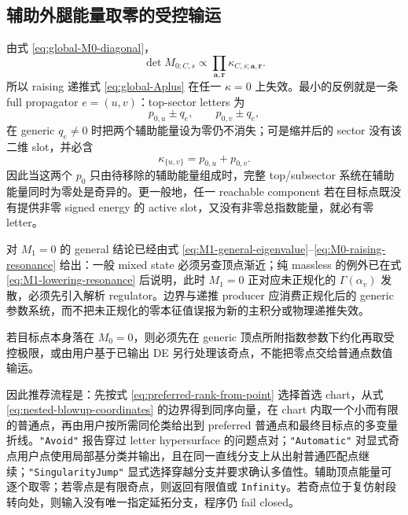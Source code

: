 \documentclass[11pt,a4paper]{ctexart}
\begin{document}
\subsection{辅助外腿能量取零的受控输运}

由式 \eqref{eq:global-M0-diagonal}，
\begin{equation}
 \det M_{0;C,s}\propto
 \prod_{\bm a,\bm r}\kappa_{C,s;\bm a,\bm r}.
 \label{eq:M0-determinant-letters}
\end{equation}
所以 raising 递推式 \eqref{eq:global-Aplus} 在任一 $\kappa=0$ 上失效。最小的反例就是一条 full propagator $e=(u,v)$：top-sector letters 为
\begin{equation}
 p_{0,u}\pm q_e,
 \qquad
 p_{0,v}\pm q_e,
 \end{equation}
在 generic $q_e\neq0$ 时把两个辅助能量设为零仍不消失；可是缩并后的 sector 没有该二维 slot，并必含
\begin{equation}
 \kappa_{\{u,v\}}=p_{0,u}+p_{0,v}.
 \label{eq:contracted-zero-letter}
\end{equation}
因此当这两个 $p_0$ 只由待移除的辅助能量组成时，完整 top/subsector 系统在辅助能量同时为零处是奇异的。更一般地，任一 reachable component 若在目标点既没有提供非零 signed energy 的 active slot，又没有非零总指数能量，就必有零 letter。

对 $M_1=0$ 的 general 结论已经由式 \eqref{eq:M1-general-eigenvalue}--\eqref{eq:M0-raising-resonance} 给出：一般 mixed state 必须另查顶点渐近；纯 massless 的例外已在式 \eqref{eq:M1-lowering-resonance} 后说明，此时 $M_1=0$ 正对应未正规化的 $\Gamma(\alpha_v)$ 发散，必须先引入解析 regulator。边界与递推 producer 应消费正规化后的 generic 参数系统，而不把未正规化的零本征值误报为新的主积分或物理递推失效。

若目标点本身落在 $M_0=0$，则必须先在 generic 顶点所附指数参数下约化再取受控极限，或由用户基于已输出 DE 另行处理该奇点，不能把零点交给普通点数值输运。

因此推荐流程是：先按式 \eqref{eq:preferred-rank-from-point} 选择首选 chart，从式 \eqref{eq:nested-blowup-coordinates} 的边界得到同序向量，在 chart 内取一个小而有限的普通点，再由用户按所需同伦类给出到 preferred 普通点和最终目标点的多变量折线。\texttt{"Avoid"} 报告穿过 letter hypersurface 的问题点对；\texttt{"Automatic"} 对显式奇点用户点使用局部基分类并输出，且在同一直线分支上从出射普通匹配点继续；\texttt{"SingularityJump"} 显式选择穿越分支并要求确认多值性。辅助顶点能量可逐个取零；若零点是有限奇点，则返回有限值或 \texttt{Infinity}。若奇点位于复仿射段转向处，则输入没有唯一指定延拓分支，程序仍 fail closed。
\end{document}
